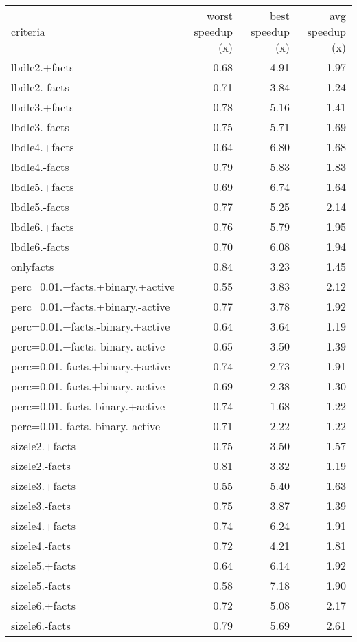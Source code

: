 \hspace{-5em}
\begin{minipage}{\textwidth}
	\small
	\begin{tabular}{lrrr}
		\toprule
		criteria	&	worst speedup (x)	&	best speedup (x)	&	avg speedup (x) \\
		\cmidrule(r){1-4}
		lbdle2.+facts	&	0.68	&	4.91	&	1.97 \\
		lbdle2.-facts	&	0.71	&	3.84	&	1.24 \\
		lbdle3.+facts	&	0.78	&	5.16	&	1.41 \\
		lbdle3.-facts	&	0.75	&	5.71	&	1.69 \\
		lbdle4.+facts	&	0.64	&	6.80	&	1.68 \\
		lbdle4.-facts	&	0.79	&	5.83	&	1.83 \\
		lbdle5.+facts	&	0.69	&	6.74	&	1.64 \\
		lbdle5.-facts	&	0.77	&	5.25	&	2.14 \\
		lbdle6.+facts	&	0.76	&	5.79	&	1.95 \\
		lbdle6.-facts	&	0.70	&	6.08	&	1.94 \\
		\cmidrule(r){1-4}
		onlyfacts	&	\cellcolor{green}0.84	&	3.23	&	1.45 \\
		\cmidrule(r){1-4}
		perc=0.01.+facts.+binary.+active	&	\cellcolor{red}0.55	&	3.83	&	2.12 \\
		perc=0.01.+facts.+binary.-active	&	0.77	&	3.78	&	1.92 \\
		perc=0.01.+facts.-binary.+active	&	0.64	&	3.64	&	\cellcolor{red}1.19 \\
		perc=0.01.+facts.-binary.-active	&	0.65	&	3.50	&	1.39 \\
		perc=0.01.-facts.+binary.+active	&	0.74	&	2.73	&	1.91 \\
		perc=0.01.-facts.+binary.-active	&	0.69	&	2.38	&	1.30 \\
		perc=0.01.-facts.-binary.+active	&	0.74	&	\cellcolor{red}1.68	&	1.22 \\
		perc=0.01.-facts.-binary.-active	&	0.71	&	2.22	&	1.22 \\
		\cmidrule(r){1-4}
		sizele2.+facts	&	0.75	&	3.50	&	1.57 \\
		sizele2.-facts	&	0.81	&	3.32	&	\cellcolor{red}1.19 \\
		sizele3.+facts	&	\cellcolor{red}0.55	&	5.40	&	1.63 \\
		sizele3.-facts	&	0.75	&	3.87	&	1.39 \\
		sizele4.+facts	&	0.74	&	6.24	&	1.91 \\
		sizele4.-facts	&	0.72	&	4.21	&	1.81 \\
		sizele5.+facts	&	0.64	&	6.14	&	1.92 \\
		sizele5.-facts	&	0.58	&	\cellcolor{green}7.18	&	1.90 \\
		sizele6.+facts	&	0.72	&	5.08	&	2.17 \\
		sizele6.-facts	&	0.79	&	5.69	&	\cellcolor{green}2.61 \\
		\bottomrule
	\end{tabular}
\end{minipage}